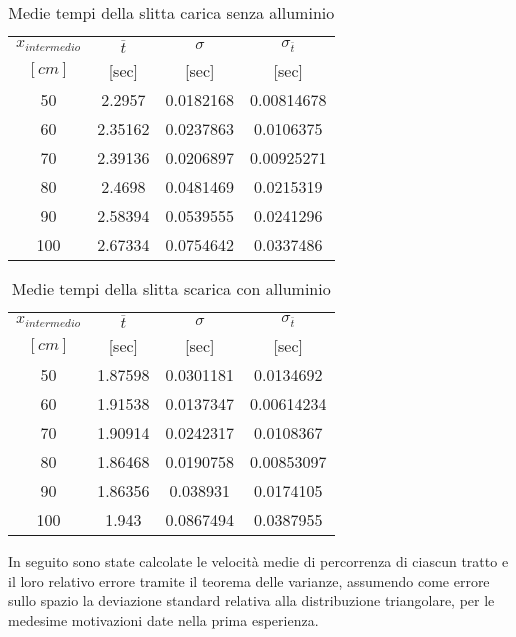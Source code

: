 \documentclass[a4paper,11pt,oneside]{article}
\begin{document}
\begin{table}[h!]%
\centering
\begin{tabular}{c|ccc}
\toprule
$x_{intermedio}$&$\overline{t}$&$\sigma$&$\sigma_{\overline{t}}$\\
$[\si{cm}]$&[sec]&[sec]&[sec]\\
\midrule
50	&2.2957	&0.0182168	&0.00814678\\
60	&2.35162	&0.0237863	&0.0106375\\
70	&2.39136	&0.0206897	&0.00925271\\
80	&2.4698	&0.0481469	&0.0215319\\
90  &2.58394	&0.0539555	&0.0241296\\
100	&2.67334	&0.0754642	&0.0337486\\
\bottomrule
\end{tabular}
    \caption{Medie tempi della slitta carica senza alluminio}
    \label{tab:sm_na}
\end{table}

\begin{table}[h!]%
\centering
\begin{tabular}{c|ccc}
\toprule
$x_{intermedio}$&$\overline{t}$&$\sigma$&$\sigma_{\overline{t}}$\\
$[\si{cm}]$&[sec]&[sec]&[sec]\\
\midrule
50	&1.87598	&0.0301181	&0.0134692\\
60	&1.91538	&0.0137347	&0.00614234\\
70	&1.90914	&0.0242317	&0.0108367\\
80	&1.86468	&0.0190758	&0.00853097\\
90	&1.86356	&0.038931	&0.0174105\\
100	&1.943	    &0.0867494	&0.0387955\\
\bottomrule
\end{tabular}
    \caption{Medie tempi della slitta scarica con alluminio}
    \label{tab:nm_sa}
\end{table}



In seguito sono state calcolate le velocità medie di percorrenza di ciascun tratto e il loro relativo errore tramite il teorema delle varianze, assumendo come errore sullo spazio la deviazione standard relativa alla distribuzione triangolare, per le medesime motivazioni date nella prima esperienza.\\
\end{document}
